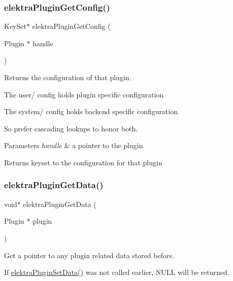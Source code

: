 \subsubsection{\texorpdfstring{elektra\+Plugin\+Get\+Config()}{elektraPluginGetConfig()}}
{\footnotesize\ttfamily Key\+Set$\ast$ elektra\+Plugin\+Get\+Config (\begin{DoxyParamCaption}\item[{Plugin $\ast$}]{handle }\end{DoxyParamCaption})}



Returns the configuration of that plugin. 


\begin{DoxyItemize}
\item The user/ config holds plugin specific configuration
\item The system/ config holds backend specific configuration
\end{DoxyItemize}

So prefer cascading lookups to honor both.


\begin{DoxyParams}{Parameters}
{\em handle} & a pointer to the plugin\\
\hline
\end{DoxyParams}
\begin{DoxyReturn}{Returns}
keyset to the configuration for that plugin 
\end{DoxyReturn}
\mbox{\label{group__plugin_gaafcf3216b46292f222b8cc7828b4dd20}} 
\subsubsection{\texorpdfstring{elektra\+Plugin\+Get\+Data()}{elektraPluginGetData()}}
{\footnotesize\ttfamily void$\ast$ elektra\+Plugin\+Get\+Data (\begin{DoxyParamCaption}\item[{Plugin $\ast$}]{plugin }\end{DoxyParamCaption})}



Get a pointer to any plugin related data stored before. 

If \hyperlink{group__plugin_gaf4b941a52ff55d0ca2a9158d90208ef2}{elektra\+Plugin\+Set\+Data()} was not called earlier, N\+U\+LL will be returned.


